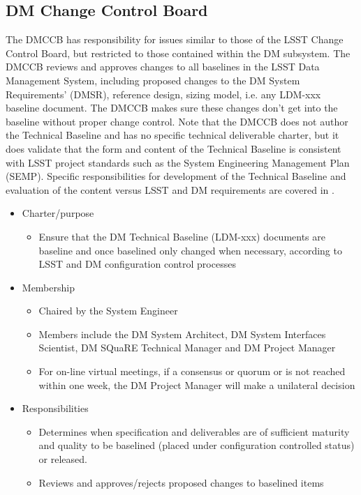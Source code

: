 \subsection{DM Change Control Board \label{sect:tct}}
The DMCCB has responsibility for issues similar to those of the LSST Change Control Board, but restricted to those contained within the DM subsystem. 
The DMCCB reviews and approves changes to all baselines in the LSST Data Management System, including proposed changes to the DM System Requirements' (DMSR), reference design, sizing model, i.e. any LDM-xxx baseline document.
The DMCCB makes sure these changes don't get into the baseline without proper change control. 
Note that the DMCCB does not author the Technical Baseline and has no specific technical deliverable charter, but it does validate that the form and content of the Technical Baseline is consistent with LSST project standards such as the System Engineering Management Plan (SEMP).  
Specific responsibilities for development of the Technical Baseline and evaluation of the content versus LSST and DM requirements are covered in .
\begin{itemize}
\item Charter/purpose
	\begin{itemize}
	\item Ensure that the DM Technical Baseline (LDM-xxx) documents are baseline and once baselined only changed when necessary, according to LSST and DM configuration control processes
	\end{itemize}
\item Membership
	\begin{itemize}
	\item Chaired by the System Engineer
	\item Members include the DM System Architect, DM System Interfaces Scientist, DM SQuaRE Technical Manager and DM Project Manager
	\item For on-line virtual meetings, if a consensus or  quorum or is not reached within one week, the DM Project Manager will make a unilateral decision
	\end{itemize}
\item Responsibilities
	\begin{itemize}
	\item Determines when specification and deliverables are of sufficient maturity and quality to be baselined (placed under configuration controlled status) or released. 
	\item Reviews and approves/rejects proposed changes to baselined items
	\end{itemize}
\end{itemize}

